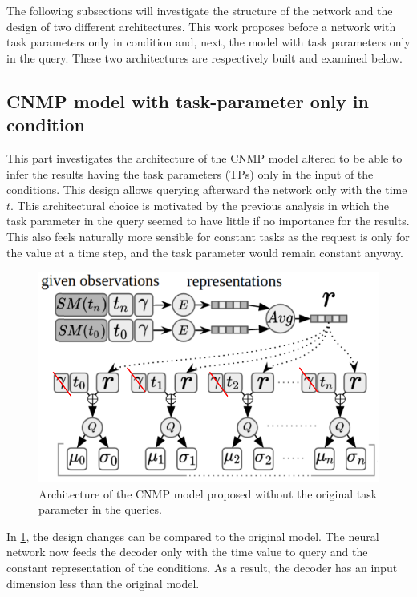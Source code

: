 The following subsections will investigate the structure of the network and the design of two different architectures. This work proposes before a network with task parameters only in condition and, next, the model with task parameters only in the query. These two architectures are respectively built and examined below.




\subsection{CNMP model with task-parameter only in condition}
This part investigates the architecture of the CNMP model altered to be able to infer the results having the task parameters (TPs) only in the input of the conditions. This design allows querying afterward the network only with the time $t$. 
This architectural choice is motivated by the previous analysis in which the task parameter in the query seemed to have little if no importance for the results. This also feels naturally more sensible for constant tasks as the request is only for the value at a time step, and the task parameter would remain constant anyway. 

\begin{figure}
    \centering
    \includegraphics[width=0.7\linewidth]{figures/CNMP_short_no_tp_query.png}
    \caption{ Architecture of the CNMP model proposed without the original task parameter in the queries. }
    \label{fig:CNMP_short_no_tp_query}
\end{figure}

In \cref{fig:CNMP_short_no_tp_query}, the design changes can be compared to the original model. The neural network now feeds the decoder only with the time value to query and the constant representation of the conditions. As a result, the decoder has an input dimension less than the original model.

